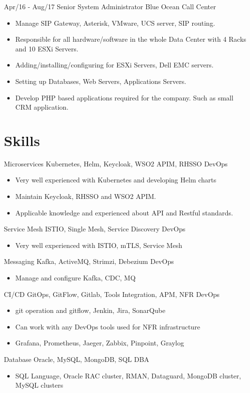 \documentclass[]{friggeri-cv}
\begin{document}
\begin{entrylist}
{    }
  \entry
    {Apr/16 - Aug/17}
    {Senior System Administrator}
    {Blue Ocean Call Center}
    {
      \begin{itemize}
        \item Manage SIP Gateway, Asterisk, VMware, UCS server, SIP routing.
        \item Responsible for all hardware/software in the whole Data Center with 4 Racks and 10 ESXi Servers.
        \item Adding/installing/configuring for ESXi Servers, Dell EMC servers.
        \item Setting up Databases, Web Servers, Applications Servers.
        \item Develop PHP based applications required for the company. Such as small CRM application.
      \end{itemize}
      }
\end{entrylist}

\section{Skills}
\begin{entrylist}
  \entry
  {Microservices}
  {Kubernetes, Helm, Keycloak, WSO2 APIM, RHSSO}
  {DevOps}
  {  \begin{itemize}
      \item Very well experienced with Kubernetes and developing Helm charts
      \item Maintain Keycloak, RHSSO and WSO2 APIM.
      \item Applicable knowledge and experienced about API and Restful standards.
    \end{itemize}}
  \entry
  {Service Mesh}
  {ISTIO, Single Mesh, Service Discovery}
  {DevOps}
  {  \begin{itemize}
      \item Very well experienced with ISTIO, mTLS, Service Mesh
    \end{itemize}}
  \entry
  {Messaging}
  {Kafka, ActiveMQ, Strimzi, Debezium}
  {DevOps}
  { \begin{itemize}
      \item Manage and configure Kafka, CDC, MQ
    \end{itemize}}
  \entry
  {CI/CD}
  {GitOps, GitFlow, Gitlab, Tools Integration, APM, NFR}
  {DevOps}
  { \begin{itemize}
      \item git operation and gitflow, Jenkin, Jira, SonarQube
      \item Can work with any DevOps tools used for NFR infrastructure
      \item Grafana, Prometheus, Jaeger, Zabbix, Pinpoint, Graylog
    \end{itemize}}
  \entry
  {Database}
  {Oracle, MySQL, MongoDB, SQL}
  {DBA}
  { \begin{itemize}
      \item SQL Language, Oracle RAC cluster, RMAN, Dataguard, MongoDB cluster, MySQL clusters
    \end{itemize}}
  
\end{entrylist}
\end{document}
